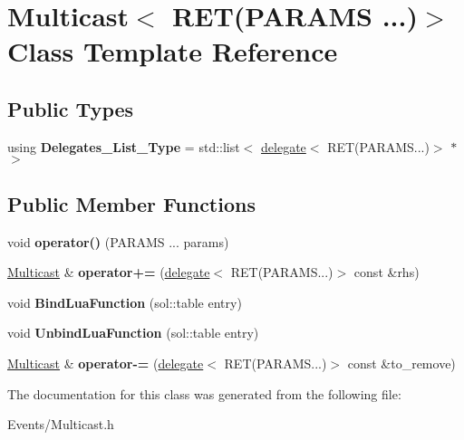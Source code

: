 \hypertarget{classMulticast_3_01RET_07PARAMS_01_8_8_8_08_4}{}\section{Multicast$<$ R\+ET(P\+A\+R\+A\+MS ...)$>$ Class Template Reference}
\label{classMulticast_3_01RET_07PARAMS_01_8_8_8_08_4}
\subsection*{Public Types}
\begin{DoxyCompactItemize}
\item 
\mbox{\label{classMulticast_3_01RET_07PARAMS_01_8_8_8_08_4_ab57179d4df800b359cf57852915ac7f9}} 
using {\bfseries Delegates\+\_\+\+List\+\_\+\+Type} = std\+::list$<$ \hyperlink{classdelegate}{delegate}$<$ R\+ET(P\+A\+R\+A\+M\+S...)$>$ $\ast$$>$
\end{DoxyCompactItemize}
\subsection*{Public Member Functions}
\begin{DoxyCompactItemize}
\item 
\mbox{\label{classMulticast_3_01RET_07PARAMS_01_8_8_8_08_4_a00b04130a79e11b3392cccfa6860a5dc}} 
void {\bfseries operator()} (P\+A\+R\+A\+MS ... params)
\item 
\mbox{\label{classMulticast_3_01RET_07PARAMS_01_8_8_8_08_4_ab6e807daae7260d0634a6cfa4d2ae3c9}} 
\hyperlink{classMulticast}{Multicast} \& {\bfseries operator+=} (\hyperlink{classdelegate}{delegate}$<$ R\+ET(P\+A\+R\+A\+M\+S...)$>$ const \&rhs)
\item 
\mbox{\label{classMulticast_3_01RET_07PARAMS_01_8_8_8_08_4_a3cb78b20a54493bd90d2b4ffe775f303}} 
void {\bfseries Bind\+Lua\+Function} (sol\+::table entry)
\item 
\mbox{\label{classMulticast_3_01RET_07PARAMS_01_8_8_8_08_4_ab9eb1d49586afe1e037991a4a9501b3a}} 
void {\bfseries Unbind\+Lua\+Function} (sol\+::table entry)
\item 
\mbox{\label{classMulticast_3_01RET_07PARAMS_01_8_8_8_08_4_a2ff76f2e8e08f15375e28291550da1b1}} 
\hyperlink{classMulticast}{Multicast} \& {\bfseries operator-\/=} (\hyperlink{classdelegate}{delegate}$<$ R\+ET(P\+A\+R\+A\+M\+S...)$>$ const \&to\+\_\+remove)
\end{DoxyCompactItemize}


The documentation for this class was generated from the following file\+:\begin{DoxyCompactItemize}
\item 
Events/Multicast.\+h\end{DoxyCompactItemize}
